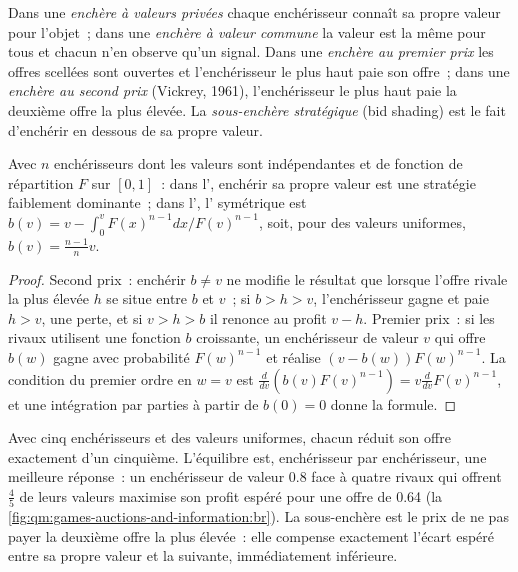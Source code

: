 \begin{definition}\label{def:qm:games-auctions-and-information:auctions}
Dans une \emph{enchère à valeurs privées} chaque enchérisseur connaît sa propre valeur pour l'objet~; dans une \emph{enchère à valeur commune} la valeur est la même pour tous et chacun
n'en observe qu'un signal. Dans une \emph{enchère au premier prix} les offres scellées sont ouvertes et l'enchérisseur le plus haut paie son offre~; dans une \emph{enchère au second prix}
(Vickrey, 1961), l'enchérisseur le plus haut paie la deuxième offre la plus élevée. La \emph{sous-enchère stratégique} (bid shading) est le fait d'enchérir en dessous de sa propre valeur.
\end{definition}

\begin{proposition}\label{prop:qm:games-auctions-and-information:bids}
Avec $n$ enchérisseurs dont les valeurs sont indépendantes et de fonction de répartition $F$ sur $[0, 1]$~: dans l', enchérir sa propre valeur est une stratégie faiblement dominante~; dans l', l' symétrique
est $b(v) = v - \int_0^vF(x)^{n-1}dx/F(v)^{n-1}$, soit, pour des valeurs uniformes, $b(v) = \frac{n-1}nv$.
\end{proposition}

\begin{proof}
Second prix~: enchérir $b \ne v$ ne modifie le résultat que lorsque l'offre rivale la plus élevée $h$ se situe entre $b$ et $v$~; si $b > h > v$, l'enchérisseur gagne et paie $h > v$, une perte, et si $v > h > b$ il renonce au
profit $v - h$. Premier prix~: si les rivaux utilisent une fonction $b$ croissante, un enchérisseur de valeur $v$ qui offre $b(w)$ gagne avec probabilité $F(w)^{n-1}$ et réalise $(v - b(w))F(w)^{n-1}$. La condition du premier ordre en $w = v$ est
$\frac{d}{dv}(b(v)F(v)^{n-1}) = v\frac{d}{dv}F(v)^{n-1}$, et une intégration par parties à partir de $b(0) = 0$ donne la formule.
\end{proof}

Avec cinq enchérisseurs et des valeurs uniformes, chacun réduit son offre exactement d'un cinquième. L'équilibre est, enchérisseur par enchérisseur, une meilleure réponse~: un enchérisseur de valeur 0.8 face à quatre rivaux qui offrent $\frac45$ de leurs valeurs
maximise son profit espéré pour une offre de 0.64 (la \cref{fig:qm:games-auctions-and-information:br}). La sous-enchère est le prix de ne pas payer la deuxième offre la plus élevée~: elle compense exactement l'écart espéré entre
sa propre valeur et la suivante, immédiatement inférieure.

